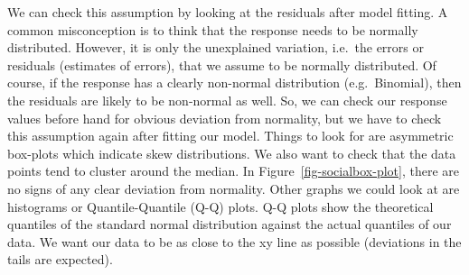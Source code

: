 \documentclass[
  letterpaper,
]{book}
\newenvironment{Shaded}{\begin{snugshade}}{\end{snugshade}}
\newcommand{\AttributeTok}[1]{\textcolor[rgb]{0.40,0.45,0.13}{#1}}
\newcommand{\CommentTok}[1]{\textcolor[rgb]{0.37,0.37,0.37}{#1}}
\newcommand{\DecValTok}[1]{\textcolor[rgb]{0.68,0.00,0.00}{#1}}
\newcommand{\FunctionTok}[1]{\textcolor[rgb]{0.28,0.35,0.67}{#1}}
\newcommand{\NormalTok}[1]{\textcolor[rgb]{0.00,0.23,0.31}{#1}}
\newcommand{\OtherTok}[1]{\textcolor[rgb]{0.00,0.23,0.31}{#1}}
\newcommand{\SpecialCharTok}[1]{\textcolor[rgb]{0.37,0.37,0.37}{#1}}
\newcommand{\StringTok}[1]{\textcolor[rgb]{0.13,0.47,0.30}{#1}}
\begin{document}
We can check this assumption by looking at the residuals after model
fitting. A common misconception is to think that the response needs to
be normally distributed. However, it is only the unexplained variation,
i.e.~the errors or residuals (estimates of errors), that we assume to be
normally distributed. Of course, if the response has a clearly
non-normal distribution (e.g.~Binomial), then the residuals are likely
to be non-normal as well. So, we can check our response values before
hand for obvious deviation from normality, but we have to check this
assumption again after fitting our model. Things to look for are
asymmetric box-plots which indicate skew distributions. We also want to
check that the data points tend to cluster around the median. In
Figure~\ref{fig-socialbox-plot}, there are no signs of any clear
deviation from normality. Other graphs we could look at are histograms
or Quantile-Quantile (Q-Q) plots. Q-Q plots show the theoretical
quantiles of the standard normal distribution against the actual
quantiles of our data. We want our data to be as close to the xy line as
possible (deviations in the tails are expected).

\begin{Shaded}
\end{Shaded}
\end{document}

